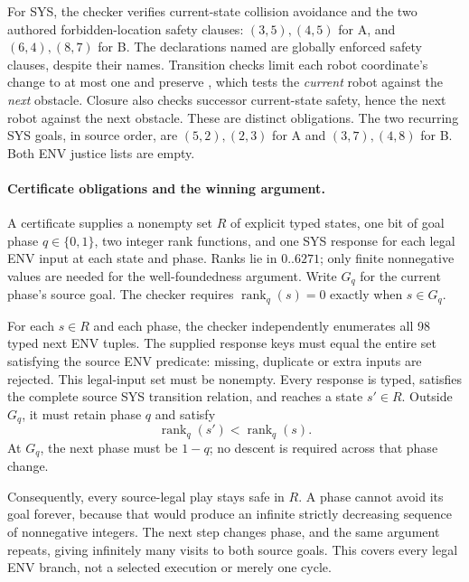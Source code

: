 For SYS, the checker verifies current-state collision avoidance and
the two authored forbidden-location safety clauses: $(3,5),(4,5)$ for A,
and $(6,4),(8,7)$ for B. The declarations named
 are globally enforced safety clauses, despite
their names. Transition checks limit each robot coordinate's change
to at most one and preserve
, which tests the \emph{current} robot against
the \emph{next} obstacle. Closure also checks successor current-state
safety, hence the next robot against the next obstacle. These are
distinct obligations. The two recurring SYS goals, in source order,
are $(5,2),(2,3)$ for A and $(3,7),(4,8)$ for B. Both ENV justice lists
are empty.

\paragraph{Certificate obligations and the winning argument.}
A certificate supplies a nonempty set $R$ of explicit typed states,
one bit of goal phase $q\in\{0,1\}$, two integer rank functions, and
one SYS response for each legal ENV input at each state and phase.
Ranks lie in $0..6271$; only finite nonnegative values are needed for
the well-foundedness argument. Write $G_q$ for the current phase's
source goal. The checker requires
$\operatorname{rank}_q(s)=0$ exactly when $s\in G_q$.

For each $s\in R$ and each phase, the checker independently enumerates
all 98 typed next ENV tuples. The supplied response keys must equal
the entire set satisfying the source ENV predicate: missing, duplicate
or extra inputs are rejected. This legal-input set must be nonempty.
Every response is typed, satisfies the complete source SYS transition
relation, and reaches a state $s'\in R$. Outside $G_q$, it must retain
phase $q$ and satisfy
\[
 \operatorname{rank}_q(s')<\operatorname{rank}_q(s).
\]
At $G_q$, the next phase must be $1-q$; no descent is required across
that phase change.

Consequently, every source-legal play stays safe in $R$. A phase cannot
avoid its goal forever, because that would produce an infinite strictly
decreasing sequence of nonnegative integers. The next step changes
phase, and the same argument repeats, giving infinitely many visits
to both source goals. This covers every legal ENV branch, not a
selected execution or merely one cycle.


